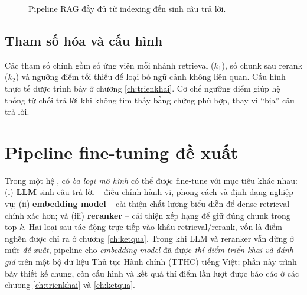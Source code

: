 \begin{figure}[htbp]
\centering
{}
\caption{Pipeline RAG đầy đủ từ indexing đến sinh câu trả lời.}
\label{fig:pipeline-rag}
\end{figure}

\subsection{Tham số hóa và cấu hình}

Các tham số chính gồm số ứng viên mỗi nhánh retrieval ($k_1$), số chunk sau rerank
($k_2$) và ngưỡng điểm tối thiểu để loại bỏ ngữ cảnh không liên quan. Cấu hình thực tế được
trình bày ở chương \ref{ch:trienkhai}. Cơ chế ngưỡng điểm giúp hệ thống từ chối trả lời
khi không tìm thấy bằng chứng phù hợp, thay vì ``bịa'' câu trả lời.

\section{Pipeline fine-tuning đề xuất}
\label{sec:pipeline-ft}

Trong một hệ \rag, có \emph{ba loại mô hình} có thể được fine-tune với mục tiêu khác nhau:
(i) \textbf{LLM} sinh câu trả lời -- điều chỉnh hành vi, phong cách và định dạng nghiệp vụ;
(ii) \textbf{embedding model} -- cải thiện chất lượng biểu diễn để dense retrieval chính xác
hơn; và (iii) \textbf{reranker} -- cải thiện xếp hạng để giữ đúng chunk trong top-$k$. Hai
loại sau tác động trực tiếp vào khâu retrieval/rerank, vốn là điểm nghẽn được chỉ ra ở chương
\ref{ch:ketqua}. Trong khi LLM và reranker vẫn dừng ở mức \emph{đề xuất}, pipeline cho
\emph{embedding model} đã được \emph{thí điểm triển khai và đánh giá} trên một bộ dữ liệu
Thủ tục Hành chính (TTHC) tiếng Việt; phần này trình bày thiết kế chung, còn cấu hình và kết
quả thí điểm lần lượt được báo cáo ở các chương \ref{ch:trienkhai} và \ref{ch:ketqua}.

